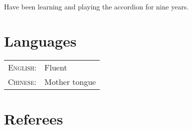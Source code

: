\documentclass[a4paper,10pt]{article} %
\begin{document}
Have been learning and playing the accordion for nine years.



\section{Languages}

\begin{tabular}{rl}
\textsc{English:} & Fluent\\

\textsc{Chinese:} & Mother tongue\\
\end{tabular}


\section{Referees}
\end{document}
